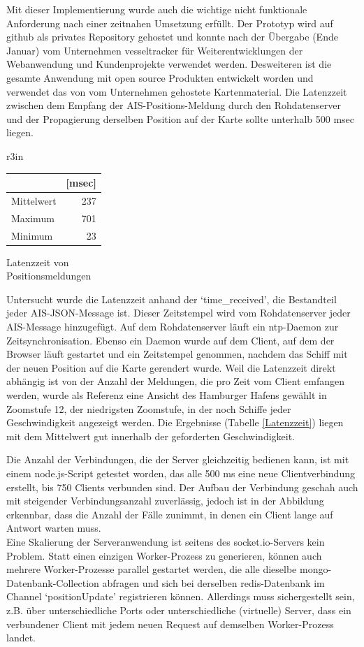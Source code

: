 Mit dieser Implementierung wurde auch die wichtige nicht funktionale Anforderung nach einer zeitnahen Umsetzung erfüllt. Der Prototyp wird auf github als privates Repository gehostet und konnte nach der Übergabe (Ende Januar) vom Unternehmen vesseltracker für Weiterentwicklungen der Webanwendung und Kundenprojekte verwendet werden. 
Desweiteren ist die gesamte Anwendung mit open source Produkten entwickelt worden und verwendet das von vom Unternehmen gehostete Kartenmaterial.\newline
Die Latenzzeit zwischen dem Empfang der AIS-Positions-Meldung durch den Rohdatenserver und der Propagierung derselben Position auf der Karte sollte unterhalb 500 msec liegen. 
\begin {wraptable}{r}{3in}
\begin{center}
\begin{tabular}{| l|r|}\hline
& [msec]\\\hline
Mittelwert & 237 \\
Maximum & 701\\
Minimum & 23\\\hline
\end{tabular}
\caption[Latenzzeit von Positionsmeldungen]{Latenzzeit von\\ Positionsmeldungen}
\label{Latenzeit}
\end{center}
 \end {wraptable}
Untersucht wurde die Latenzzeit anhand der ‘time\_received’, die Bestandteil jeder AIS-JSON-Message ist. Dieser Zeitstempel wird vom Rohdatenserver jeder AIS-Message hinzugefügt. Auf dem Rohdatenserver läuft ein ntp-Daemon zur Zeitsynchronisation. Ebenso ein Daemon wurde auf dem Client, auf dem der Browser läuft gestartet und ein Zeitstempel genommen, nachdem das Schiff mit der neuen Position auf die Karte gerendert wurde. Weil die Latenzzeit direkt abhängig ist von der Anzahl der Meldungen, die pro Zeit vom Client emfangen werden, wurde als Referenz eine Ansicht des Hamburger Hafens gewählt in Zoomstufe 12, der niedrigsten Zoomstufe, in der noch Schiffe jeder Geschwindigkeit angezeigt werden. Die Ergebnisse (Tabelle \ref{Latenzzeit}) liegen mit dem Mittelwert gut innerhalb der geforderten Geschwindigkeit.

Die Anzahl der Verbindungen, die der Server gleichzeitig bedienen kann, ist mit einem node.js-Script getestet worden, das alle 500 ms eine neue Clientverbindung erstellt, bis 750 Clients verbunden sind. Der Aufbau der Verbindung geschah auch mit steigender Verbindungsanzahl zuverlässig, jedoch ist in der Abbildung erkennbar, dass die Anzahl der Fälle zunimmt, in denen ein Client lange auf Antwort warten muss.
\\Eine Skalierung der Serveranwendung ist seitens des socket.io-Servers kein Problem. Statt einen einzigen Worker-Prozess zu generieren, können auch mehrere Worker-Prozesse parallel gestartet werden, die alle dieselbe mongo-Datenbank-Collection abfragen und sich bei derselben redis-Datenbank im Channel ‘positionUpdate’ registrieren können. Allerdings muss sichergestellt sein, z.B.  über unterschiedliche Ports oder unterschiedliche (virtuelle) Server, dass ein verbundener Client mit jedem neuen Request auf demselben Worker-Prozess landet.

